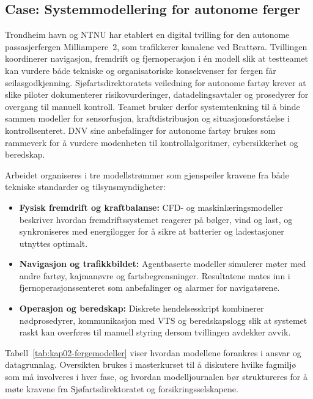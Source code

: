 \subsection{Case: Systemmodellering for autonome ferger}
Trondheim havn og NTNU har etablert en digital tvilling for den autonome passasjerfergen Milliampere~2, som trafikkerer kanalene
ved Brattøra.\citep{ntnu2023milliampere2} Tvillingen koordinerer navigasjon, fremdrift og fjernoperasjon i én modell slik at
testteamet kan vurdere både tekniske og organisatoriske konsekvenser før fergen får seilasgodkjenning. Sjøfartsdirektoratets
veiledning for autonome fartøy krever at slike piloter dokumenterer risikovurderinger, datadelingsavtaler og prosedyrer for
overgang til manuell kontroll.\citep{sdir2023autonomefartoy} Teamet bruker derfor systemtenkning til å binde sammen modeller for
sensorfusjon, kraftdistribusjon og situasjonsforståelse i kontrollsenteret. DNV sine anbefalinger for autonome fartøy brukes som
rammeverk for å vurdere modenheten til kontrollalgoritmer, cybersikkerhet og beredskap.\citep{dnv2024autonomous}

Arbeidet organiseres i tre modellstrømmer som gjenspeiler kravene fra både tekniske standarder og tilsynsmyndigheter:
\begin{itemize}
    \item \textbf{Fysisk fremdrift og kraftbalanse:} CFD- og maskinlæringsmodeller beskriver hvordan fremdriftssystemet reagerer
    på bølger, vind og last, og synkroniseres med energilogger for å sikre at batterier og ladestasjoner utnyttes optimalt.
    \item \textbf{Navigasjon og trafikkbildet:} Agentbaserte modeller simulerer møter med andre fartøy, kajmanøvre og
    fartsbegrensninger. Resultatene mates inn i fjernoperasjonssenteret som anbefalinger og alarmer for navigatørene.
    \item \textbf{Operasjon og beredskap:} Diskrete hendelsesskript kombinerer nødprosedyrer, kommunikasjon med VTS og
    beredskapslogg slik at systemet raskt kan overføres til manuell styring dersom tvillingen avdekker avvik.
\end{itemize}

Tabell~\ref{tab:kap02-fergemodeller} viser hvordan modellene forankres i ansvar og datagrunnlag. Oversikten brukes i masterkurset
til å diskutere hvilke fagmiljø som må involveres i hver fase, og hvordan modelljournalen bør struktureres for å møte kravene fra
Sjøfartsdirektoratet og forsikringsselskapene.

